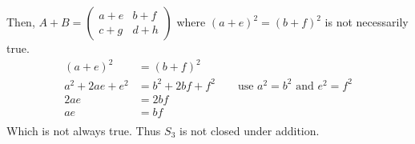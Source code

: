 \documentclass{article}
\begin{document}
Then, \(A + B = \begin{pmatrix} a + e & b + f \\ c + g & d + h \end{pmatrix}\) where \((a + e)^2 = (b + f)^2\) is not necessarily true. \\
\begin{align*}
   (a + e)^2 &= (b + f)^2 \\
   a^2 + 2ae + e^2 &= b^2 + 2bf + f^2  \qquad \text{use \(a^2 = b^2\) and \(e^2 = f^2\)} \\
   2ae &= 2bf \\
   ae &= bf \\
\end{align*}
Which is not always true. Thus \(S_3\) is not closed under addition. \\
\end{document}
